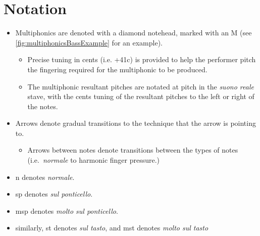 \section*{Notation}
\begin{itemize}
  \item Multiphonics are denoted with a diamond notehead, marked with an M (see \autoref{fig:multiphonicsBassExample} for an example). 
  \begin{itemize}
    \item Precise tuning in cents (i.e. +41c) is provided to help the performer pitch the fingering required for the multiphonic to be produced.
    \item The multiphonic resultant pitches are notated at pitch in the \emph{suono reale} stave, with the cents tuning of the resultant pitches to the left or right of the notes.
  \end{itemize}
    \item Arrows denote gradual transitions to the technique that the arrow is pointing to.\begin{itemize}
      \item Arrows between notes denote transitions between the types of notes (i.e.\ \emph{normale} to harmonic finger pressure.)
    \end{itemize}
    \item n denotes \emph{normale}.
    \item sp denotes \emph{sul ponticello}.
    \item msp denotes \emph{molto sul ponticello}.
    \item similarly, st denotes \emph{sul tasto}, and mst denotes \emph{molto sul tasto}
\end{itemize}

\newpage\label{app:celloPiece Score}
